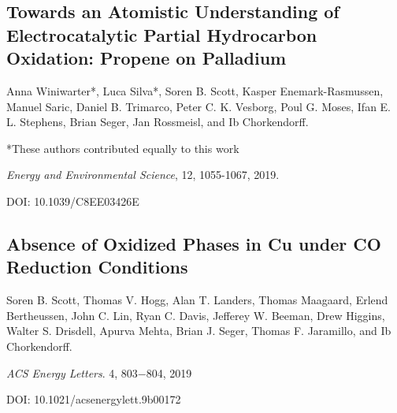 		
	\subsection{Towards an Atomistic Understanding of Electrocatalytic Partial Hydrocarbon Oxidation: Propene on Palladium}\label{Winiwarter2019}
	
	Anna Winiwarter*, Luca Silva*, Soren B. Scott, Kasper Enemark-Rasmussen, Manuel Saric, Daniel B. Trimarco, Peter C. K. Vesborg, Poul G. Moses, Ifan E. L. Stephens, Brian Seger, Jan Rossmeisl, and Ib Chorkendorff.
	
	*These authors contributed equally to this work
	
	\textit{Energy and Environmental Science}, 12, 1055-1067, 2019.
	
	DOI:  10.1039/C8EE03426E
	
	

	
	\subsection{Absence of Oxidized Phases in Cu under CO Reduction Conditions}\label{Scott2019_GIXRD}
	
	Soren B. Scott, Thomas V. Hogg, Alan T. Landers, Thomas Maagaard, Erlend Bertheussen, John C. Lin, Ryan C. Davis, Jefferey W. Beeman, Drew Higgins, Walter S. Drisdell, Apurva Mehta, Brian J. Seger, Thomas F. Jaramillo, and Ib Chorkendorff.
	
	\textit{ACS Energy Letters}. 4, 803−804, 2019
	
	DOI: 10.1021/acsenergylett.9b00172 
	
	